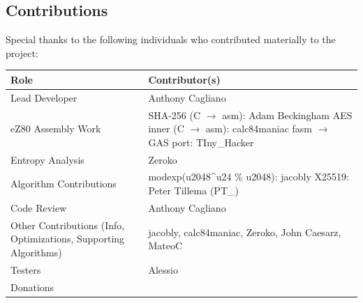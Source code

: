 \documentclass[titlepage]{report}
\renewcommand{\arraystretch}{1.5}
\begin{document}
	\subsection{Contributions}
	Special thanks to the following individuals who contributed materially to the project:
	\begin{table}[htbp]
		\centering
		\renewcommand{\arraystretch}{1.12}
		{\footnotesize
			\begin{tabularx}{\textwidth}{p{} p{}}
			\hline
			\textbf{Role} & \textbf{Contributor(s)} \\
			\hline
			Lead Developer & Anthony Cagliano \\
			eZ80 Assembly Work &
				SHA-256 (C $\rightarrow$ asm): Adam Beckingham\newline
				AES inner (C $\rightarrow$ asm): calc84maniac\newline
				fasm $\rightarrow$ GAS port: TIny\_Hacker \\
			Entropy Analysis & Zeroko \\
			Algorithm Contributions &
				modexp(u2048\textasciicircum u24 \% u2048): jacobly\newline
				X25519: Peter Tillema (PT\_) \\
			Code Review & Anthony Cagliano \\\hline
			Other Contributions (Info, Optimizations, Supporting Algorithms) &
				jacobly, calc84maniac, Zeroko, John Caesarz, MateoC \\\hline
			Testers & Alessio \\\hline
			Donations & \\\hline
		\end{tabularx}
		}
	\end{table}
\end{document}
